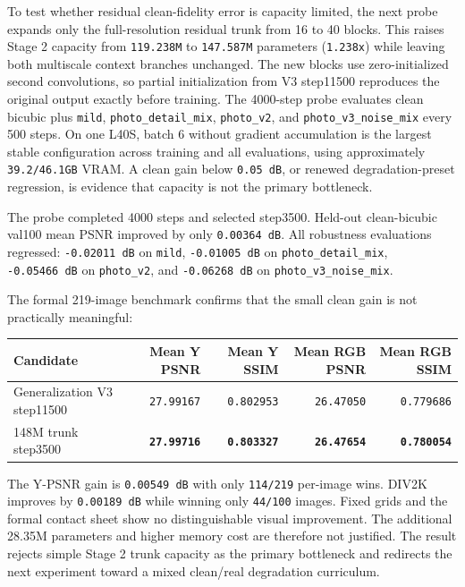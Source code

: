 \documentclass[
  10pt,
]{article}
\begin{document}
To test whether residual clean-fidelity error is capacity limited, the
next probe expands only the full-resolution residual trunk from 16 to 40
blocks. This raises Stage 2 capacity from \texttt{119.238M} to
\texttt{147.587M} parameters (\texttt{1.238x}) while leaving both
multiscale context branches unchanged. The new blocks use
zero-initialized second convolutions, so partial initialization from V3
step11500 reproduces the original output exactly before training. The
4000-step probe evaluates clean bicubic plus \texttt{mild},
\texttt{photo\_detail\_mix}, \texttt{photo\_v2}, and
\texttt{photo\_v3\_noise\_mix} every 500 steps. On one L40S, batch 6
without gradient accumulation is the largest stable configuration across
training and all evaluations, using approximately \texttt{39.2/46.1GB}
VRAM. A clean gain below \texttt{0.05\ dB}, or renewed
degradation-preset regression, is evidence that capacity is not the
primary bottleneck.

The probe completed 4000 steps and selected step3500. Held-out
clean-bicubic val100 mean PSNR improved by only \texttt{0.00364\ dB}.
All robustness evaluations regressed: \texttt{-0.02011\ dB} on
\texttt{mild}, \texttt{-0.01005\ dB} on \texttt{photo\_detail\_mix},
\texttt{-0.05466\ dB} on \texttt{photo\_v2}, and \texttt{-0.06268\ dB}
on \texttt{photo\_v3\_noise\_mix}.

The formal 219-image benchmark confirms that the small clean gain is not
practically meaningful:

\begin{longtable}[]{@{}lrrrr@{}}
\toprule\noalign{}
Candidate & Mean Y PSNR & Mean Y SSIM & Mean RGB PSNR & Mean RGB SSIM \\
\midrule\noalign{}
\endhead
\bottomrule\noalign{}
\endlastfoot
Generalization V3 step11500 & \texttt{27.99167} & \texttt{0.802953} &
\texttt{26.47050} & \texttt{0.779686} \\
148M trunk step3500 & \textbf{\texttt{27.99716}} &
\textbf{\texttt{0.803327}} & \textbf{\texttt{26.47654}} &
\textbf{\texttt{0.780054}} \\
\end{longtable}

The Y-PSNR gain is \texttt{0.00549\ dB} with only \texttt{114/219}
per-image wins. DIV2K improves by \texttt{0.00189\ dB} while winning
only \texttt{44/100} images. Fixed grids and the formal contact sheet
show no distinguishable visual improvement. The additional 28.35M
parameters and higher memory cost are therefore not justified. The
result rejects simple Stage 2 trunk capacity as the primary bottleneck
and redirects the next experiment toward a mixed clean/real degradation
curriculum.
\end{document}
